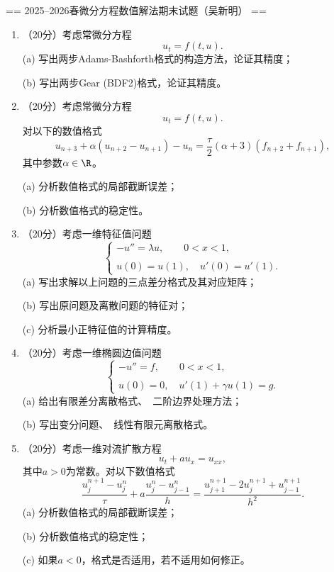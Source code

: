 
== 2025--2026春微分方程数值解法期末试题（吴新明） ==
\begin{enumerate}
\item（20分）考虑常微分方程
\[u_t = f(t,u).\]
(a) 写出两步Adams-Bashforth格式的构造方法，论证其精度；

(b) 写出两步Gear (BDF2)格式，论证其精度。

\item（20分）考虑常微分方程
\[u_t = f(t,u).\]
对以下的数值格式
\[u_{n+3}+\alpha(u_{n+2}-u_{n+1})-u_n
= \frac{\tau}{2}(\alpha+3)(f_{n+2}+f_{n+1}),\]
其中参数$\alpha\in\R$。

(a) 分析数值格式的局部截断误差；

(b) 分析数值格式的稳定性。

\item（20分）考虑一维特征值问题
\[\begin{cases}
    - u'' = \lambda u, \qquad 0<x<1,\\ \\
    u(0)=u(1),\quad u'(0) = u'(1).
\end{cases}\]
(a) 写出求解以上问题的三点差分格式及其对应矩阵；

(b) 写出原问题及离散问题的特征对；

(c) 分析最小正特征值的计算精度。

\item（20分）考虑一维椭圆边值问题
\[\begin{cases}
    - u'' = f, \qquad 0<x<1,\\ \\
    u(0)=0,\quad u'(1) + \gamma u(1) = g.
\end{cases}\]
(a) 给出有限差分离散格式、\ 二阶边界处理方法；

(b) 写出变分问题、\ 线性有限元离散格式。

\item（20分）考虑一维对流扩散方程
\[u_t+ a u_x = u_{xx},\]
其中$a>0$为常数。对以下数值格式
\[\frac{u_j^{n+1}-u_j^n}{\tau} + a \frac{u_j^n-u_{j-1}^n}{h} 
= \frac{u_{j+1}^{n+1}-2 u_j^{n+1}+u_{j-1}^{n+1}}{h^2}.\]
(a) 分析数值格式的局部截断误差；

(b) 分析数值格式的稳定性；

(c) 如果$a<0$，格式是否适用，若不适用如何修正。
\end{enumerate}


